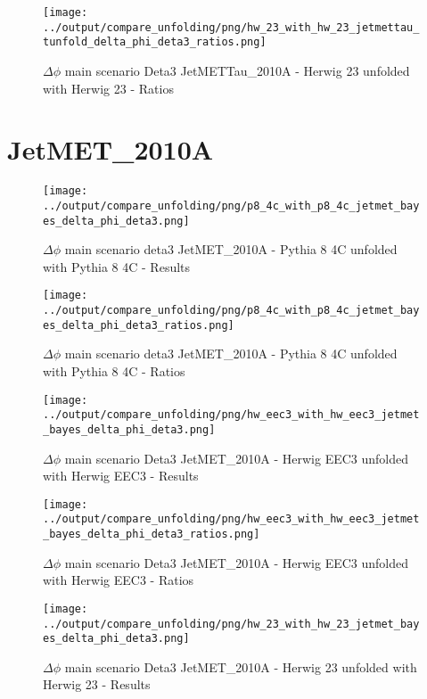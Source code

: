\documentclass[11pt]{book}
\begin{document}
\begin{figure}[ht]
\centering
\texttt{[image: ../output/compare\_unfolding/png/hw\_23\_with\_hw\_23\_jetmettau\_tunfold\_delta\_phi\_deta3\_ratios.png]}
\caption{$\Delta\phi$ main scenario Deta3 JetMETTau\_2010A - Herwig 23 unfolded with Herwig 23 - Ratios}
\label{hw_23_hw_23_jetmettau_tunfold_delta_phi_deta3_b}
\end{figure}


\clearpage
\section{JetMET\_2010A}


\begin{figure}[ht]
\centering
\texttt{[image: ../output/compare\_unfolding/png/p8\_4c\_with\_p8\_4c\_jetmet\_bayes\_delta\_phi\_deta3.png]}
\caption{$\Delta\phi$ main scenario deta3 JetMET\_2010A - Pythia 8 4C unfolded with Pythia 8 4C - Results}
\label{p8_p8_jetmet_bayes_delta_phi_deta3_a}
\end{figure}

\begin{figure}[ht]
\centering
\texttt{[image: ../output/compare\_unfolding/png/p8\_4c\_with\_p8\_4c\_jetmet\_bayes\_delta\_phi\_deta3\_ratios.png]}
\caption{$\Delta\phi$ main scenario deta3 JetMET\_2010A - Pythia 8 4C unfolded with Pythia 8 4C - Ratios}
\label{p8_p8_jetmet_bayes_delta_phi_deta3_b}
\end{figure}

\begin{figure}[ht]
\centering
\texttt{[image: ../output/compare\_unfolding/png/hw\_eec3\_with\_hw\_eec3\_jetmet\_bayes\_delta\_phi\_deta3.png]}
\caption{$\Delta\phi$ main scenario Deta3 JetMET\_2010A - Herwig EEC3 unfolded with Herwig EEC3 - Results}
\label{hw_eec3_hw_eec3_jetmet_bayes_delta_phi_deta3_a}
\end{figure}

\begin{figure}[ht]
\centering
\texttt{[image: ../output/compare\_unfolding/png/hw\_eec3\_with\_hw\_eec3\_jetmet\_bayes\_delta\_phi\_deta3\_ratios.png]}
\caption{$\Delta\phi$ main scenario Deta3 JetMET\_2010A - Herwig EEC3 unfolded with Herwig EEC3 - Ratios}
\label{hw_eec3_hw_eec3_jetmet_bayes_delta_phi_deta3_b}
\end{figure}

\begin{figure}[ht]
\centering
\texttt{[image: ../output/compare\_unfolding/png/hw\_23\_with\_hw\_23\_jetmet\_bayes\_delta\_phi\_deta3.png]}
\caption{$\Delta\phi$ main scenario Deta3 JetMET\_2010A - Herwig 23 unfolded with Herwig 23 - Results}
\label{hw_23_hw_23_jetmet_bayes_delta_phi_deta3_a}
\end{figure}
\end{document}
